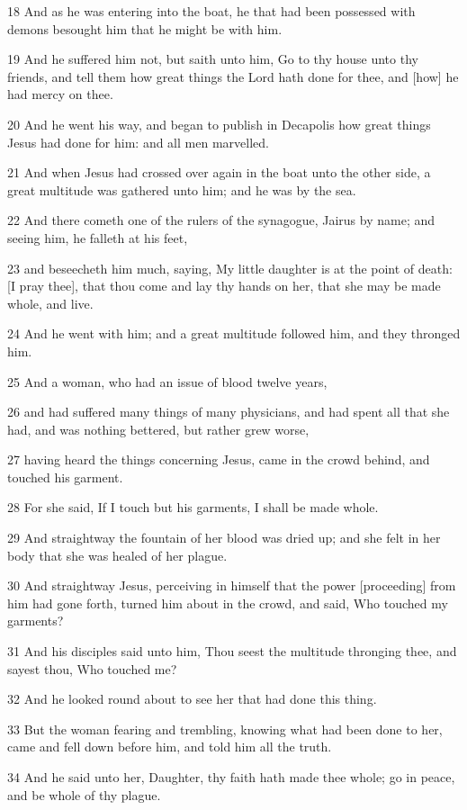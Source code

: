 \par 18 And as he was entering into the boat, he that had been possessed with demons besought him that he might be with him.
\par 19 And he suffered him not, but saith unto him, Go to thy house unto thy friends, and tell them how great things the Lord hath done for thee, and [how] he had mercy on thee.
\par 20 And he went his way, and began to publish in Decapolis how great things Jesus had done for him: and all men marvelled.
\par 21 And when Jesus had crossed over again in the boat unto the other side, a great multitude was gathered unto him; and he was by the sea.
\par 22 And there cometh one of the rulers of the synagogue, Jairus by name; and seeing him, he falleth at his feet,
\par 23 and beseecheth him much, saying, My little daughter is at the point of death: [I pray thee], that thou come and lay thy hands on her, that she may be made whole, and live.
\par 24 And he went with him; and a great multitude followed him, and they thronged him.
\par 25 And a woman, who had an issue of blood twelve years,
\par 26 and had suffered many things of many physicians, and had spent all that she had, and was nothing bettered, but rather grew worse,
\par 27 having heard the things concerning Jesus, came in the crowd behind, and touched his garment.
\par 28 For she said, If I touch but his garments, I shall be made whole.
\par 29 And straightway the fountain of her blood was dried up; and she felt in her body that she was healed of her plague.
\par 30 And straightway Jesus, perceiving in himself that the power [proceeding] from him had gone forth, turned him about in the crowd, and said, Who touched my garments?
\par 31 And his disciples said unto him, Thou seest the multitude thronging thee, and sayest thou, Who touched me?
\par 32 And he looked round about to see her that had done this thing.
\par 33 But the woman fearing and trembling, knowing what had been done to her, came and fell down before him, and told him all the truth.
\par 34 And he said unto her, Daughter, thy faith hath made thee whole; go in peace, and be whole of thy plague.
